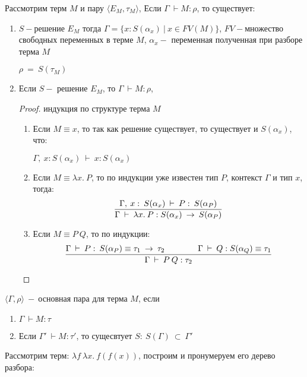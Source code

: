 	\begin{lemma}
	Рассмотрим терм $M$ и пару $\big\langle E_M, \tau_M\big\rangle$, Если $\Gamma\:\vdash M:\rho$, то существует:
	\end{lemma}	
		\begin{enumerate}
		\item $S-$решение $E_M$ тогда $\Gamma=\{x : S(\alpha_x)\:|\:x\in FV(M)\}$, $FV-$множество свободных переменных в терме $M$, $\alpha_x-$ переменная полученная при разборе терма $M$\par
		$\rho\:=\:S(\tau_M)$
		\item Если $S-$ решение $E_M$, то $\Gamma\:\vdash M:\rho$,
		\begin{proof}индукция по структуре терма $M$

			\begin{enumerate}
				\item Если $M\equiv x$, то так как решение существует, то существует и $S(\alpha_x)$, что: \par$\Gamma,\:x:S(\alpha_x)\:\vdash \:x:S(\alpha_x)$
				\item Если $M\equiv \lambda x.\:P$, то по индукции уже известен тип $P$, контекст $\Gamma$ и тип $x$, тогда: $${\Gamma,\:x:\:S(\alpha_x)\:\vdash \:P:\:S(\alpha_P) \over \Gamma\:\vdash \:\lambda x.\:P:S(\alpha_x)\:\rightarrow\:S(\alpha_P)}$$
				\item Если $M\equiv P\:Q$, то по индукции: $${ \Gamma\:\vdash \:P:\:S(\alpha_P)\equiv\tau_1\:\rightarrow\:\tau_2 \hspace{4em} \Gamma\:\vdash \:Q:S(\alpha_Q)\equiv\tau_1\over \Gamma\:\vdash \:P\:Q:\tau_2}$$
			\end{enumerate}					
		\end{proof}
	\end{enumerate}				
		 $\big \langle\Gamma,\rho\big\rangle\:-\:$основная пара для терма $M$, если 
		 \begin{enumerate}
			\item $\Gamma\:\vdash M:\tau$
			\item Если $\Gamma'\:\vdash M:\tau'$, то сущесвтует $S:\:S(\Gamma)\:\subset\:\Gamma'$
		 \end{enumerate}
		 \begin{example}
		\end{example}
		 	Рассмотрим терм: $\lambda f\:\lambda x.\:f(f(x))$, построим и пронумеруем его дерево разбора:\par
